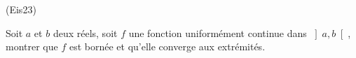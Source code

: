 \begin{tiny}(Eis23)\end{tiny} \label{limunifcont}
Soit $a$ et $b$ deux r{\'e}els, soit $f$ une fonction uniform{\'e}ment continue dans $\left] a,b\right[ $, montrer que $f$ est born{\'e}e et qu'elle converge aux extrémités.
